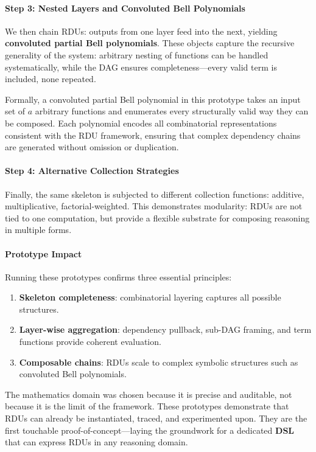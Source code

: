 \documentclass[12pt]{article}
\begin{document}
\paragraph{Step 3: Nested Layers and Convoluted Bell Polynomials}  
We then chain RDUs: outputs from one layer feed into the next, yielding \textbf{convoluted partial Bell polynomials}. These objects capture the recursive generality of the system: arbitrary nesting of functions can be handled systematically, while the DAG ensures completeness—every valid term is included, none repeated.  

Formally, a convoluted partial Bell polynomial in this prototype takes an input set of $a$ arbitrary functions and enumerates every structurally valid way they can be composed. Each polynomial encodes all combinatorial representations consistent with the RDU framework, ensuring that complex dependency chains are generated without omission or duplication.


\paragraph{Step 4: Alternative Collection Strategies}  
Finally, the same skeleton is subjected to different collection functions: additive, multiplicative, factorial-weighted. This demonstrates modularity: RDUs are not tied to one computation, but provide a flexible substrate for composing reasoning in multiple forms.  

\paragraph{Prototype Impact}  
Running these prototypes confirms three essential principles:  

\begin{enumerate}
    \item \textbf{Skeleton completeness}: combinatorial layering captures all possible structures.  
    \item \textbf{Layer-wise aggregation}: dependency pullback, sub-DAG framing, and term functions provide coherent evaluation.  
    \item \textbf{Composable chains}: RDUs scale to complex symbolic structures such as convoluted Bell polynomials.  
\end{enumerate}

The mathematics domain was chosen because it is precise and auditable, not because it is the limit of the framework. These prototypes demonstrate that RDUs can already be instantiated, traced, and experimented upon. They are the first touchable proof-of-concept—laying the groundwork for a dedicated \textbf{DSL} that can express RDUs in any reasoning domain.  
\end{document}
